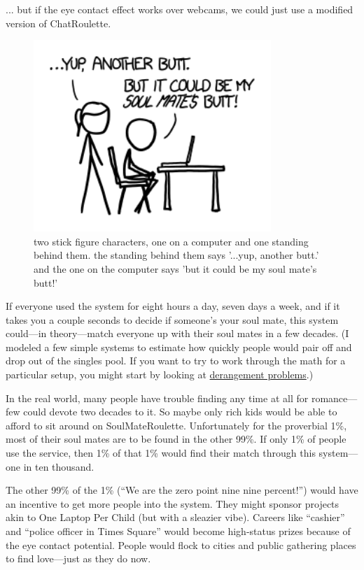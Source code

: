 {... but if the eye contact effect works over webcams, we could just use a modified version of ChatRoulette.}

\begin{figure}[!htbp]
\centering
\includegraphics[scale=0.5, max width=0.8\textwidth]{imgs/a/9/soulmates_laptop.png}
\caption{two stick figure characters, one on a computer and one standing behind them. the standing behind them says '...yup, another butt.' and the one on the computer says 'but it could be my soul mate's butt!'}
\end{figure}

{If everyone used the system for eight hours a day, seven days a week, and if it takes you a couple seconds to decide if someone’s your soul mate, this system could—in theory—match everyone up with their soul mates in a few decades. (I modeled a few simple systems to estimate how quickly people would pair off and drop out of the singles pool. If you want to try to work through the math for a particular setup, you might start by looking at \href{http://en.wikipedia.org/wiki/Derangement}{derangement problems}.)}

{In the real world, many people have trouble finding any time at all for romance—few could devote two decades to it. So maybe only rich kids would be able to afford to sit around on SoulMateRoulette. Unfortunately for the proverbial 1\%, most of their soul mates are to be found in the other 99\%. If only 1\% of people use the service, then 1\% of that 1\% would find their match through this system—one in ten thousand.}

{The other 99\% of the 1\% (“We are the zero point nine nine percent!”) would have an incentive to get more people into the system. They might sponsor projects akin to One Laptop Per Child (but with a sleazier vibe). Careers like “cashier” and “police officer in Times Square” would become high-status prizes because of the eye contact potential. People would flock to cities and public gathering places to find love—just as they do now.}

